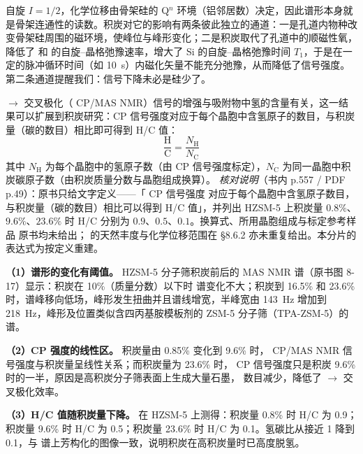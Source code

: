 \begin{principle}
 自旋 $I=1/2$，化学位移由骨架硅的 Q$^n$ 环境（铝邻居数）决定，因此谱形本身就是骨架连通性的读数。积炭对它的影响有两条彼此独立的通道：一是孔道内物种改变骨架硅周围的磁环境，使峰位与峰形变化；二是积炭取代了孔道中的顺磁性氧，降低了  和  的自旋--晶格弛豫速率，增大了 Si 的自旋--晶格弛豫时间 $T_1$，于是在一定的脉冲循环时间（如 \qty{10}{s}）内磁化矢量不能充分弛豫，从而降低了信号强度。第二条通道提醒我们：信号下降未必是硅少了。

$\rightarrow$ 交叉极化（ CP/MAS NMR）信号的增强与吸附物中氢的含量有关，这一结果可以扩展到积炭研究：CP 信号强度对应于每个晶胞中含氢原子的数目，与积炭量（碳的数目）相比即可得到 H/C 值：
\[
\frac{\mathrm{H}}{\mathrm{C}}=\frac{N_{\mathrm{H}}}{N_{\mathrm{C}}}
\]
其中 $N_{\mathrm{H}}$ 为每个晶胞中的氢原子数（由  CP 信号强度标定），$N_{\mathrm{C}}$ 为同一晶胞中积炭碳原子数（由积炭质量分数与晶胞组成换算）。
\emph{核对说明}（书内 p.557 / PDF p.49）：原书只给文字定义——「 CP 信号强度
对应于每个晶胞中含氢原子数目，与积炭量（碳的数目）相比可以得到 H/C 值」，并列出 HZSM-5 上积炭量
$0.8\%$、$9.6\%$、$23.6\%$ 时 H/C 分别为 $0.9$、$0.5$、$0.1$。换算式、所用晶胞组成与标定参考样品
原书均未给出； 的天然丰度与化学位移范围在 §8.6.2 亦未重复给出。本分片的表达式为按定义重建。
\end{principle}

\begin{dataflow}
\textbf{（1）谱形的变化有阈值。} HZSM-5 分子筛积炭前后的  MAS NMR 谱（原书图 8-17）显示：积炭在 10\%（质量分数）以下时  谱变化不大；积炭到 16.5\% 和 23.6\% 时，谱峰移向低场，峰形发生扭曲并且谱线增宽，半峰宽由 \qty{143}{Hz} 增加到 \qty{218}{Hz}，峰形及位置类似含四丙基胺模板剂的 ZSM-5 分子筛（TPA-ZSM-5）的  谱。

\textbf{（2）CP 强度的线性区。} 积炭量由 0.85\% 变化到 9.6\% 时， CP/MAS NMR 信号强度与积炭量呈线性关系；而积炭量为 23.6\% 时， CP 信号强度只是积炭 9.6\% 时的一半，原因是高积炭分子筛表面上生成大量石墨， 数目减少，降低了 $\rightarrow$ 交叉极化效率。

\textbf{（3）H/C 值随积炭量下降。} 在 HZSM-5 上测得：积炭量 0.8\% 时 H/C 为 0.9；积炭量 9.6\% 时 H/C 为 0.5；积炭量 23.6\% 时 H/C 为 0.1。氢碳比从接近 1 降到 0.1，与  谱上芳构化的图像一致，说明积炭在高积炭量时已高度脱氢。
\end{dataflow}

